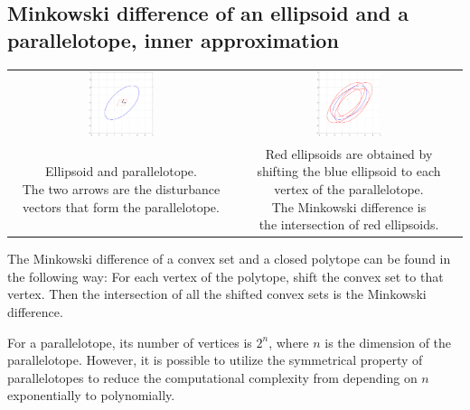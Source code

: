\documentclass{article}
\begin{document}
\subsection{Minkowski difference of an ellipsoid and a parallelotope, inner approximation}
\label{intersect_offset_ia}
\begin{table}[h!]
	\centering
	\begin{tabular}{cc}
		\includegraphics[width=0.3\textwidth]{intersect_offset_ia/1.pdf} & \includegraphics[width=0.3\textwidth]{intersect_offset_ia/2.pdf} \\
		\makecell{Ellipsoid and parallelotope. \\ The two arrows are the disturbance \\ vectors that form the parallelotope.}& \makecell{Red ellipsoids are obtained by \\ shifting the blue ellipsoid to each \\ vertex of the parallelotope.\\ The Minkowski difference is \\the intersection of red ellipsoids.} 
	\end{tabular}
	\label{intersect_offset_ia1}
\end{table}
The Minkowski difference of a convex set and a closed polytope can be found in the following way: For each vertex of the polytope, shift the convex set to that vertex. Then the intersection of all the shifted convex sets is the Minkowski difference.

For a parallelotope, its number of vertices is $2^n$, where $n$ is the dimension of the parallelotope. However, it is possible to utilize the symmetrical property of parallelotopes to reduce the computational complexity from depending on $n$ exponentially to polynomially.
\end{document}
